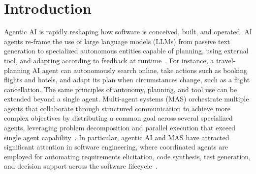 \documentclass[sigconf,nonacm]{acmart}
\begin{document}




\maketitle

\section{Introduction}
Agentic AI is rapidly reshaping how software is conceived, built, and operated.
AI agents re-frame the use of large language models (LLMs) from passive text generation to specialized autonomous entities capable of planning, using external tool, and adapting according to feedback at runtime~\cite{wei2026agentica}. %
For instance, a travel-planning AI agent can autonomously search online, take actions such as booking flights and hotels, and adapt its plan when circumstances change, such as a flight cancellation.
The same principles of autonomy, planning, and tool use can be extended beyond a single agent.
Multi-agent systems (MAS) orchestrate multiple agents that collaborate through structured communication to achieve more complex objectives by distributing a common goal across several specialized agents, leveraging problem decomposition and parallel execution that exceed single agent capability~\cite{tran2025multiagent,adimulam2026orchestration}.
In particular, agentic AI and MAS have attracted significant attention in software engineering, where coordinated agents are employed for automating requirements elicitation, code synthesis, test generation, and decision support across the software lifecycle~\cite{hong2023metagpt,he2025llmbaseda}.
\end{document}
